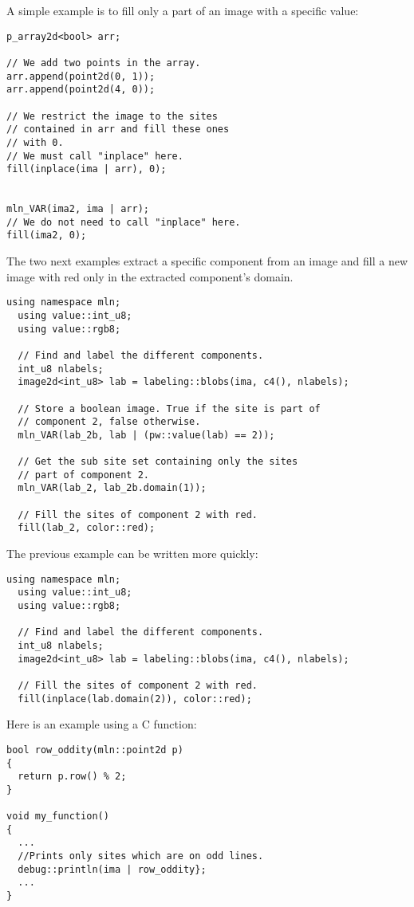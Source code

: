 \documentclass{report}
\begin{document}
A simple example is to fill only a part of an image with a specific value:
\begin{lstlisting}[frame=single]
p_array2d<bool> arr;

// We add two points in the array.
arr.append(point2d(0, 1));
arr.append(point2d(4, 0));

// We restrict the image to the sites
// contained in arr and fill these ones
// with 0.
// We must call "inplace" here.
fill(inplace(ima | arr), 0);


mln_VAR(ima2, ima | arr);
// We do not need to call "inplace" here.
fill(ima2, 0);
\end{lstlisting}

The two next examples extract a specific component from an image and fill a new
image with red only in the extracted component's domain.
\begin{lstlisting}[frame=single]
  using namespace mln;
  using value::int_u8;
  using value::rgb8;

  // Find and label the different components.
  int_u8 nlabels;
  image2d<int_u8> lab = labeling::blobs(ima, c4(), nlabels);

  // Store a boolean image. True if the site is part of
  // component 2, false otherwise.
  mln_VAR(lab_2b, lab | (pw::value(lab) == 2));

  // Get the sub site set containing only the sites
  // part of component 2.
  mln_VAR(lab_2, lab_2b.domain(1));

  // Fill the sites of component 2 with red.
  fill(lab_2, color::red);
\end{lstlisting}

The previous example can be written more quickly:
\begin{lstlisting}[frame=single]
  using namespace mln;
  using value::int_u8;
  using value::rgb8;

  // Find and label the different components.
  int_u8 nlabels;
  image2d<int_u8> lab = labeling::blobs(ima, c4(), nlabels);

  // Fill the sites of component 2 with red.
  fill(inplace(lab.domain(2)), color::red);
\end{lstlisting}

Here is an example using a C function:
\begin{lstlisting}[frame=single]
bool row_oddity(mln::point2d p)
{
  return p.row() % 2;
}

void my_function()
{
  ...
  //Prints only sites which are on odd lines.
  debug::println(ima | row_oddity};
  ...
}
\end{lstlisting}
\end{document}
